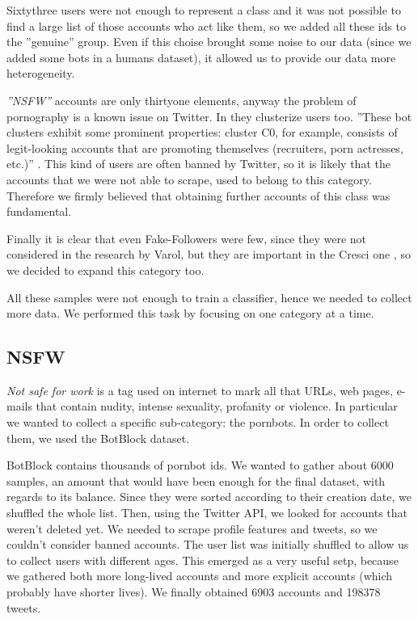 Sixtythree users were not enough to represent a class and it was not possible to find a large list of those accounts who act like them, so we added all these ids to the ''genuine'' group. Even if this choise brought some noise to our data (since we added some bots in a humans dataset), it allowed us to provide our data more heterogeneity.

\emph{''NSFW''} accounts are only thirtyone elements, anyway the problem of pornography is a known issue on Twitter. In \cite{Varol} they clusterize users too. ''These bot clusters exhibit some prominent properties: cluster C0, for example, consists of legit-looking accounts that are promoting themselves (recruiters, porn actresses, etc.)'' \cite{Varol}.
This kind of users are often banned by Twitter, so it is likely that the accounts that we were not able to scrape, used to belong to this category.
Therefore we firmly believed that obtaining further accounts of this class was fundamental.

Finally it is clear that even Fake-Followers were few, since they were not considered in the research by Varol, but they are important in the Cresci one \cite{Cresci}, so we decided to expand this category too.

All these samples were not enough to train a classifier, hence we needed to collect more data. We performed this task by focusing on one category at a time.

\subsection{NSFW}
\emph{Not safe for work} is a tag used on internet to mark all that URLs, web pages, e-mails that contain nudity, intense sexuality, profanity or violence. In particular we wanted to collect a specific sub-category: the pornbots. In order to collect them, we used the BotBlock dataset.

BotBlock contains thousands of pornbot ids. We wanted to gather about 6000 samples, an amount that would have been enough for the final dataset, with regards to its balance.
Since they were sorted according to their creation date, we shuffled the whole list. Then, using the Twitter API, we looked for accounts that weren't deleted yet. 
We needed to scrape profile features and tweets, so we couldn't consider banned accounts. The user list was initially shuffled to allow us to collect users with different ages. This emerged as a very useful setp, because we gathered both more long-lived accounts and more explicit accounts (which probably have shorter lives). We finally obtained 6903 accounts and 198378 tweets.

